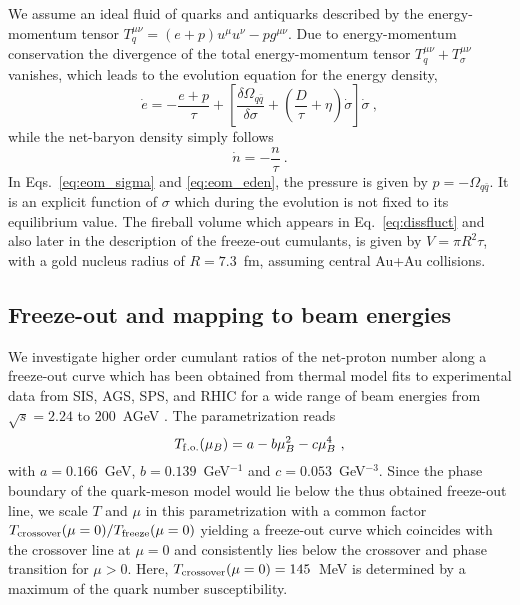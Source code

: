 \documentclass[%
 reprint,
 amsmath,amssymb,
 aps,
]{revtex4-2}
\begin{document}
We assume an ideal fluid of quarks and antiquarks described by the energy-momentum tensor $T^{\mu\nu}_q=(e+p)u^{\mu}u^{\nu}-pg^{\mu\nu}$. Due to energy-momentum conservation the divergence of the total energy-momentum tensor $T^{\mu\nu}_q+T^{\mu\nu}_\sigma$ vanishes, which leads to the evolution equation for the energy density,
\begin{equation}
\label{eq:eom_eden}
 \dot e=-\frac{e+p}{\tau}+\left[\frac{\delta\Omega_{q \bar q}}{\delta\sigma}+\left(\frac{D}{\tau}+\eta\right)\dot\sigma\right]\dot\sigma~,
\end{equation}
while the net-baryon density simply follows
\begin{equation}
 \label{eq:eom_nden}
 \dot n = -\frac{n}{\tau}~.
\end{equation}
In Eqs.~\eqref{eq:eom_sigma} and \eqref{eq:eom_eden}, the pressure is given by $p=-\Omega_{q\bar q}$. It is an explicit function of $\sigma$ which during the evolution is not fixed to its equilibrium value. The fireball volume which appears in Eq.~\eqref{eq:dissfluct} and also later in the description of the freeze-out cumulants, is given by $V=\pi R^2 \tau$, with a gold nucleus radius of $R=7.3$~fm, assuming central Au+Au collisions. 


\subsection{Freeze-out and mapping to beam energies}

We investigate higher order cumulant ratios of the net-proton number along a freeze-out curve which has been obtained from thermal model fits to experimental data from SIS, AGS, SPS, and RHIC for a wide range of beam energies from $\sqrt{s}=2.24$ to $200$~AGeV \cite{Cleymans:2005xv}. The parametrization reads
\begin{equation}
    \label{eq:freeze}
    T_{\rm f.o.}(\mu_B) = a - b\mu_B^2 - c\mu_B^4~,
\end{equation}
with $a=0.166$~GeV, $b=0.139$~GeV$^{-1}$ and  $c=0.053$~GeV$^{-3}$. Since the phase boundary of the quark-meson model would lie below the thus obtained freeze-out line, we scale $T$ and $\mu$ in this parametrization with a common factor $T_{\rm crossover}(\mu=0)/T_{\rm freeze}(\mu=0)$ yielding a freeze-out curve which coincides with the crossover line at $\mu=0$ and consistently lies below the crossover and phase transition for $\mu>0$. Here, $T_{\rm crossover}(\mu=0)=145$~MeV is determined by a maximum of the quark number susceptibility.  
\end{document}
